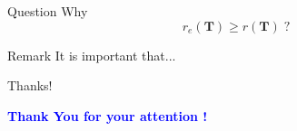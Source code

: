 \documentclass[xcolor=dvipsnames]{beamer}
\begin{document}
\begin{frame}
\begin{bclogo}[arrondi=0.1, logo=\bcquestion, couleurBarre=Maroon]
{Question}
Why
\[
r_e(\mathbf{T})\geq r(\mathbf{T}) \;?
\]
\end{bclogo}

{
\begin{bclogo}[couleur = gray!10, arrondi=0.1, logo=\bcattention, couleurBarre=Red]{Remark}
It is important that...
\end{bclogo}
}

{
\begin{bclogo}[couleur = gray!30, arrondi =0.1 ,logo=\bcfleur]{Thanks!}
\bigskip
\begin{center}
\textcolor{blue}{\textbf{{Thank You for your attention !}}}
\end{center}
\bigskip
\end{bclogo}

}

\end{frame}
\end{document}
